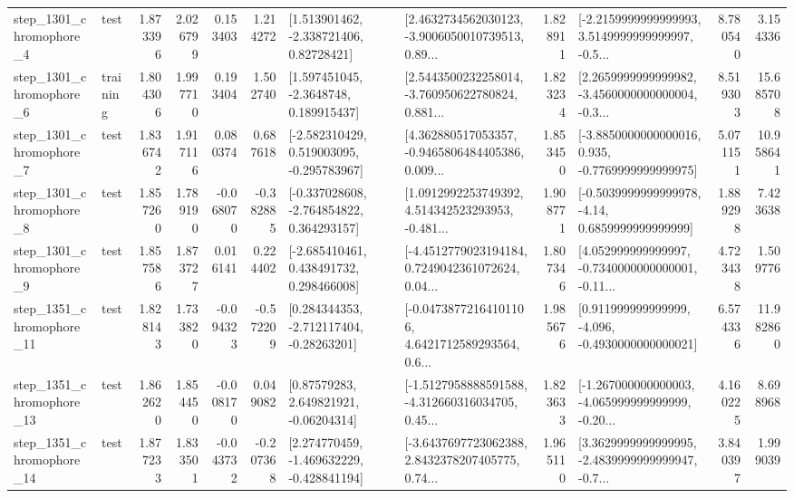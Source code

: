 \begin{tabular}{llrrrrllrlrr}
  step\_1301\_chromophore\_4 &      test &      1.873396 &    2.026799 &      0.153403 &  1.214272 &     [1.513901462, -2.338721406, 0.82728421] &  [2.4632734562030123, -3.9006050010739513, 0.89... &       1.828911 &  [-2.2159999999999993, 3.5149999999999997, -0.5... &            8.780540 &          3.154336 \\
  step\_1301\_chromophore\_6 &  training &      1.804306 &    1.997710 &      0.193404 &  1.502740 &      [1.597451045, -2.3648748, 0.189915437] &  [2.5443500232258014, -3.760950622780824, 0.881... &       1.823234 &  [2.2659999999999982, -3.4560000000000004, -0.3... &            8.519303 &         15.685708 \\
  step\_1301\_chromophore\_7 &      test &      1.836742 &    1.917116 &      0.080374 &  0.687618 &   [-2.582310429, 0.519003095, -0.295783967] &  [4.362880517053357, -0.9465806484405386, 0.009... &       1.853450 &  [-3.8850000000000016, 0.935, -0.7769999999999975] &            5.071151 &         10.958641 \\
  step\_1301\_chromophore\_8 &      test &      1.857260 &    1.789190 &     -0.068070 & -0.382885 &   [-0.337028608, -2.764854822, 0.364293157] &  [1.0912992253749392, 4.514342523293953, -0.481... &       1.908771 &   [-0.5039999999999978, -4.14, 0.6859999999999999] &            1.889298 &          7.423638 \\
  step\_1301\_chromophore\_9 &      test &      1.857586 &    1.873727 &      0.016141 &  0.224402 &    [-2.685410461, 0.438491732, 0.298466008] &  [-4.4512779023194184, 0.7249042361072624, 0.04... &       1.807346 &  [4.052999999999997, -0.7340000000000001, -0.11... &            4.723438 &          1.509776 \\
 step\_1351\_chromophore\_11 &      test &      1.828143 &    1.733820 &     -0.094323 & -0.572209 &    [0.284344353, -2.712117404, -0.28263201] &  [-0.04738772164101106, 4.6421712589293564, 0.6... &       1.985676 &   [0.911999999999999, -4.096, -0.4930000000000021] &            6.574336 &         11.982860 \\
 step\_1351\_chromophore\_13 &      test &      1.862620 &    1.854450 &     -0.008170 &  0.049082 &      [0.87579283, 2.649821921, -0.06204314] &  [-1.5127958888591588, -4.312660316034705, 0.45... &       1.823633 &  [-1.267000000000003, -4.065999999999999, -0.20... &            4.160225 &          8.698968 \\
 step\_1351\_chromophore\_14 &      test &      1.877233 &    1.833501 &     -0.043732 & -0.207368 &   [2.274770459, -1.469632229, -0.428841194] &  [-3.6437697723062388, 2.8432378207405775, 0.74... &       1.965110 &  [3.3629999999999995, -2.4839999999999947, -0.7... &            3.840397 &          1.999039 \\

\end{tabular}
